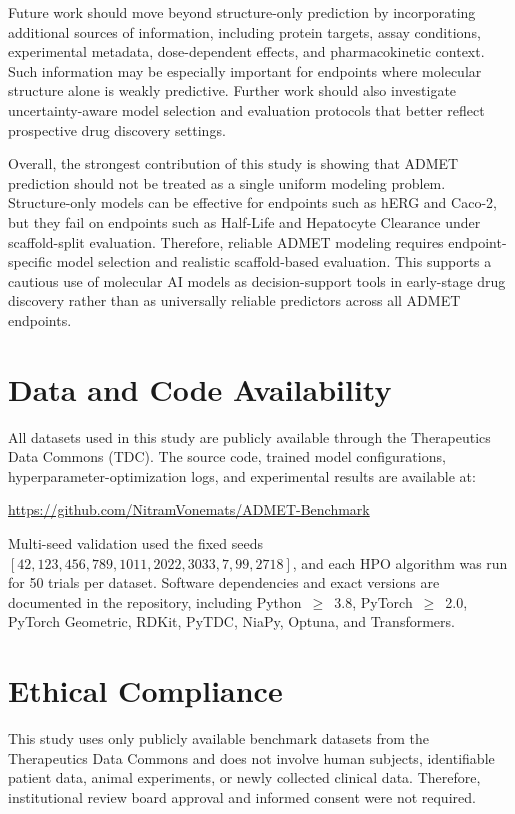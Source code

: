 \documentclass[journal]{IEEEtran}
\begin{document}
Future work should move beyond structure-only prediction by incorporating additional sources of information, including protein targets, assay conditions, experimental metadata, dose-dependent effects, and pharmacokinetic context. Such information may be especially important for endpoints where molecular structure alone is weakly predictive. Further work should also investigate uncertainty-aware model selection and evaluation protocols that better reflect prospective drug discovery settings.

Overall, the strongest contribution of this study is showing that ADMET prediction should not be treated as a single uniform modeling problem. Structure-only models can be effective for endpoints such as hERG and Caco-2, but they fail on endpoints such as Half-Life and Hepatocyte Clearance under scaffold-split evaluation. Therefore, reliable ADMET modeling requires endpoint-specific model selection and realistic scaffold-based evaluation. This supports a cautious use of molecular AI models as decision-support tools in early-stage drug discovery rather than as universally reliable predictors across all ADMET endpoints.


\section*{Data and Code Availability}
All datasets used in this study are publicly available through the Therapeutics Data Commons (TDC). The source code, trained model configurations, hyperparameter-optimization logs, and experimental results are available at:
\begin{center}
\url{https://github.com/NitramVonemats/ADMET-Benchmark}
\end{center}

Multi-seed validation used the fixed seeds $[42, 123, 456, 789, 1011, 2022, 3033, 7, 99, 2718]$, and each HPO algorithm was run for 50 trials per dataset. Software dependencies and exact versions are documented in the repository, including Python~$\geq$~3.8, PyTorch~$\geq$~2.0, PyTorch Geometric, RDKit, PyTDC, NiaPy, Optuna, and Transformers.

\section*{Ethical Compliance}
This study uses only publicly available benchmark datasets from the Therapeutics Data Commons and does not involve human subjects, identifiable patient data, animal experiments, or newly collected clinical data. Therefore, institutional review board approval and informed consent were not required.



\end{document}
